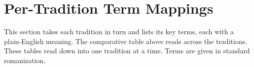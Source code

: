 \section{Per-Tradition Term Mappings}

This section takes each tradition in turn and lists its key terms, each with a plain-English meaning. The
comparative table above reads across the traditions. These tables read down into one tradition at a time.
Terms are given in standard romanization.






